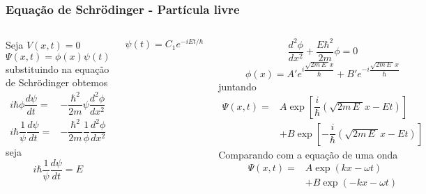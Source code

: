 \documentclass[12pt,brazil]{beamer}
\begin{document}
\begin{frame}
  \frametitle{Equação de Schrödinger - Partícula livre}
  \fontsize{9pt}{11pt}\selectfont
        
    \begin{columns}[c]

      \column{5cm}
      Seja $V(x,t)=0$
      \[
        \Psi (x,t) = \phi(x)\psi(t)
      \]
      substituindo na equação de Schrödinger obtemos
      \[
        \begin{align*}
          i\hbar \phi\dfrac{d \psi}{d t} =&  -\dfrac{\hbar^2}{2m}\psi \dfrac{d^2\phi}{dx^2}\\
          i\hbar \dfrac{1}{\psi}\dfrac{d \psi}{d t} =& -\dfrac{\hbar^2}{2m}\dfrac{1}{\phi}\dfrac{d^2\phi}{dx^2}
        \end{align*}
      \]
      seja
      \[
       i\hbar \dfrac{1}{\psi}\dfrac{d \psi}{d t} = E
      \]

      \[
       \psi(t) = C_1e^{-iEt/\hbar}
      \]

      \column{5cm}
      \[
        \dfrac{d^2\phi}{dx^2} + \dfrac{E\hbar^2}{2m}\phi =0
      \]
      \[
       \phi(x) = A'e^{i\dfrac{\sqrt{2m\,E\;}x}{\hbar}}+B'e^{-i\dfrac{\sqrt{2m\,E\;}x}{\hbar}}
      \]
      juntando
      \[
        \begin{align*}
          \Psi(x,t) =&  A \exp \left[ \dfrac{i}{\hbar}\left(  \sqrt{2m\,E\;}x - Et\right) \right]\\ 
          &  + B \exp \left[ -\dfrac{i}{\hbar}\left(  \sqrt{2m\,E\;}x - Et\right) \right]
        \end{align*}        
      \]
      Comparando com a equação de uma onda
      \[
        \begin{align*}
          \Psi(x,t) =&  A \exp \left(  kx - \omega t\right) \\
          &+ B \exp \left( -kx - \omega t\right)
        \end{align*}
      \]

      
    \end{columns}
  
\end{frame}
    
\end{document}
